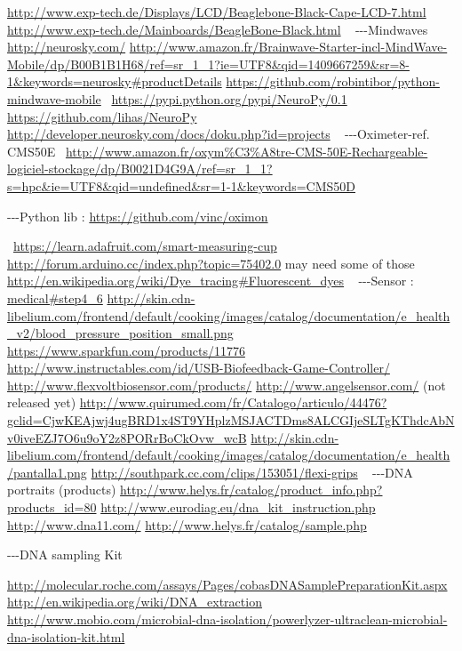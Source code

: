 \bigskip

\url{http://www.exp-tech.de/Displays/LCD/Beaglebone-Black-Cape-LCD-7.html}
\url{http://www.exp-tech.de/Mainboards/BeagleBone-Black.html}
~
{}-{}-{}-Mindwaves
\url{http://neurosky.com/}
\url{http://www.amazon.fr/Brainwave-Starter-incl-MindWave-Mobile/dp/B00B1B1H68/ref=sr_1_1?ie=UTF8&qid=1409667259&sr=8-1&keywords=neurosky#productDetails}
\url{https://github.com/robintibor/python-mindwave-mobile}
~\url{https://pypi.python.org/pypi/NeuroPy/0.1}
\url{https://github.com/lihas/NeuroPy}
\url{http://developer.neurosky.com/docs/doku.php?id=projects}
~
{}-{}-{}-Oximeter-ref. CMS50E~
\href{http://www.amazon.fr/oxym?tre-CMS-50E-Rechargeable-logiciel-stockage/dp/B0021D4G9A/ref=sr_1_1?s=hpc&ie=UTF8&qid=undefined&sr=1-1&keywords=CMS50D}{http://www.amazon.fr/oxym\%C3\%A8tre-CMS-50E-Rechargeable-logiciel-stockage/dp/B0021D4G9A/ref=sr\_1\_1?s=hpc\&ie=UTF8\&qid=undefined\&sr=1-1\&keywords=CMS50D}

\bigskip
{}-{}-{}-Python lib : \url{https://github.com/vinc/oximon}

~\url{https://learn.adafruit.com/smart-measuring-cup}
\url{http://forum.arduino.cc/index.php?topic=75402.0}
may need some of those
\url{http://en.wikipedia.org/wiki/Dye_tracing#Fluorescent_dyes}
~
{}-{}-{}-Sensor :
\href{http://www.cooking-hacks.com/documentation/tutorials/ehealth-biometric-sensor-platform-arduino-raspberry-pi-medical#step4_6}{medical\#step4\_6}
\url{http://skin.cdn-libelium.com/frontend/default/cooking/images/catalog/documentation/e_health_v2/blood_pressure_position_small.png}
\url{https://www.sparkfun.com/products/11776}
\url{http://www.instructables.com/id/USB-Biofeedback-Game-Controller/}
\url{http://www.flexvoltbiosensor.com/products/}
\url{http://www.angelsensor.com/} (not released yet)
\url{http://www.quirumed.com/fr/Catalogo/articulo/44476?gclid=CjwKEAjwj4ugBRD1x4ST9YHplzMSJACTDms8ALCGIjeSLTgKThdcAbNv0iveEZJ7O6u9oY2z8PORrBoCkOvw_wcB}
\url{http://skin.cdn-libelium.com/frontend/default/cooking/images/catalog/documentation/e_health/pantalla1.png}
\url{http://southpark.cc.com/clips/153051/flexi-grips}
~
{}-{}-{}-DNA portraits (products)
\url{http://www.helys.fr/catalog/product_info.php?products_id=80}
\url{http://www.eurodiag.eu/dna_kit_instruction.php}
\url{http://www.dna11.com/}
\url{http://www.helys.fr/catalog/sample.php}
~

{}-{}-{}-DNA sampling Kit

\url{http://molecular.roche.com/assays/Pages/cobasDNASamplePreparationKit.aspx}
\url{http://en.wikipedia.org/wiki/DNA_extraction}
\url{http://www.mobio.com/microbial-dna-isolation/powerlyzer-ultraclean-microbial-dna-isolation-kit.html}

